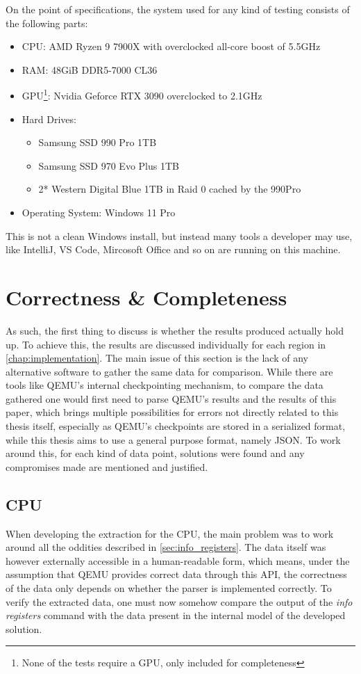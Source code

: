On the point of specifications, the system used for any kind of testing consists of the following parts:
\begin{itemize}
    \item CPU: AMD Ryzen 9 7900X with overclocked all-core boost of 5.5GHz
    \item RAM: 48GiB DDR5-7000 CL36
    \item GPU\footnote{None of the tests require a GPU, only included for completeness}: Nvidia Geforce RTX 3090 overclocked to 2.1GHz
    \item Hard Drives:
    \begin{itemize}
        \item Samsung SSD 990 Pro 1TB
        \item Samsung SSD 970 Evo Plus 1TB
        \item 2* Western Digital Blue 1TB in Raid 0 cached by the 990Pro
    \end{itemize}
    \item Operating System: Windows 11 Pro
\end{itemize}
This is not a clean Windows install, but instead many tools a developer may use,
like IntelliJ, VS Code, Mircosoft Office and so on are running on this machine.

\section{Correctness \& Completeness}
As such, the first thing to discuss is whether the results produced actually hold up.
To achieve this, the results are discussed individually for each region in \autoref{chap:implementation}.
The main issue of this section is the lack of any alternative software to gather the same data for comparison.
While there are tools like QEMU's internal checkpointing mechanism,
to compare the data gathered one would first need to parse QEMU's results and the results of this paper,
which brings multiple possibilities for errors not directly related to this thesis itself,
especially as QEMU's checkpoints are stored in a serialized format,
while this thesis aims to use a general purpose format, namely JSON.
To work around this, for each kind of data point,
solutions were found and any compromises made are mentioned and justified.

\subsection{CPU}\label{sec:eval_cpu}
When developing the extraction for the CPU,
the main problem was to work around all the oddities described in \autoref{sec:info_registers}.
The data itself was however externally accessible in a human-readable form,
which means, under the assumption that QEMU provides correct data through this API,
the correctness of the data only depends on whether the parser is implemented correctly.
To verify the extracted data, one must now somehow compare the output of the \emph{info registers} command
with the data present in the internal model of the developed solution.

